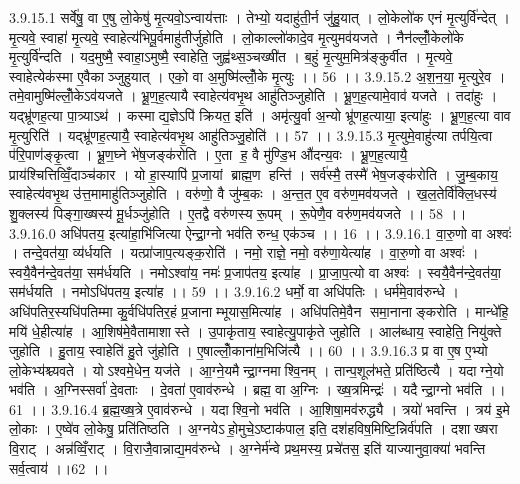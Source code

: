 3.9.15.1
सर्वे॑षु॒ वा ए॒षु लो॒केषु॑ मृ॒त्यवो॒ऽन्वाय॑त्ताः । तेभ्यो॒ यदाहु॑ती॒र्न जु॑हु॒यात् । लो॒केलो॑क एनं मृ॒त्युर्वि॑न्देत् । मृ॒त्यवे॒ स्वाहा॑ मृ॒त्यवे॒ स्वाहेत्य॑भिपू॒र्वमाहु॑तीर्जुहोति । लो॒काल्लो॑कादे॒व मृ॒त्युमव॑यजते । नैन॑ल्लोँ॒केलो॑के मृ॒त्युर्वि॑न्दति । यद॒मुष्मै॒ स्वाहा॒ऽमुष्मै॒ स्वाहेति॒ जुह्व॑थ्स॒ञ्चख्षी॑त । ब॒हुं मृ॒त्युम॒मित्र॑ङ्कुर्वीत । मृ॒त्यवे॒ स्वाहेत्येक॑स्मा ए॒वैकाञ्जुहुयात् । एको॒ वा अ॒मुष्मि॑ल्लोँ॒के मृ॒त्युः ।। 56 ।।
3.9.15.2
अ॒श॒न॒या॒ मृ॒त्युरे॒व । तमे॒वामुष्मि॑ल्लोँ॒केऽव॑यजते । भ्रू॒ण॒ह॒त्यायै स्वाहेत्य॑वभृ॒थ आहु॑तिञ्जुहोति । भ्रू॒ण॒ह॒त्यामे॒वाव॑ यजते । तदा॑हुः । यद्भ्रू॑णह॒त्या पा॒त्र्याऽथ॑ । कस्माद्य॒ज्ञेऽपि॑ क्रियत॒ इति॑ । अमृ॑त्यु॒र्वा अ॒न्यो भ्रू॑णह॒त्याया॒ इत्या॑हुः । भ्रू॒ण॒ह॒त्या वाव मृ॒त्युरिति॑ । यद्भ्रू॑णह॒त्यायै॒ स्वाहेत्य॑वभृ॒थ आहु॑तिञ्जु॒होति॑ ।। 57 ।।
3.9.15.3
मृ॒त्युमे॒वाहु॑त्या तर्पयि॒त्वा प॑रि॒पाण॑ङ्कृ॒त्वा । भ्रू॒ण॒घ्ने भे॑ष॒जङ्क॑रोति । ए॒ता ह॒ वै मु॑ण्डि॒भ औ॑दन्य॒वः । भ्रू॒ण॒ह॒त्यायै॒ प्राय॑श्चित्तिव्विँ॒दाञ्च॑कार । यो हा॒स्यापि॑ प्र॒जायां ब्राह्म॒ण हन्ति॑ । सर्व॑स्मै॒ तस्मै॑ भेष॒जङ्क॑रोति । जु॒म्ब॒काय॒ स्वाहेत्य॑वभृ॒थ उ॑त्त॒मामाहु॑तिञ्जुहोति । वरु॑णो॒ वै जु॑म्ब॒कः । अ॒न्त॒त ए॒व वरु॑ण॒मव॑यजते । ख॒ल॒तेर्वि॑क्लि॒धस्य॑ शु॒क्लस्य॑ पिङ्गा॒ख्षस्य॑ मू॒र्धञ्जु॑होति । ए॒तद्वै वरु॑णस्य रू॒पम् । रू॒पेणै॒व वरु॑ण॒मव॑यजते ।। 58 ।।
3.9.16.0
अधि॑पतय॒ इत्या॑हा॒भि॑जित्या ऐन्द्रा॒ग्नो भव॑ति रुन्ध॒ एक॑ञ्च ।। 16 ।।
3.9.16.1
वा॒रु॒णो वा अश्वः॑ । तन्दे॒वत॑या॒ व्य॑र्धयति । यत्प्रा॑जाप॒त्यङ्क॒रोति॑ । नमो॒ राज्ञे॒ नमो॒ वरु॑णा॒येत्या॑ह । वा॒रु॒णो वा अश्वः॑ । स्वयै॒वैन॑न्दे॒वत॑या॒ सम॑र्धयति । नमोऽश्वा॑य॒ नमः॑ प्र॒जाप॑तय॒ इत्या॑ह । प्रा॒जा॒प॒त्यो वा अश्वः॑ । स्वयै॒वैन॑न्दे॒वत॑या॒ सम॑र्धयति । नमोऽधि॑पतय॒ इत्या॑ह ।। 59 ।।
3.9.16.2
धर्मो॒ वा अधि॑पतिः । धर्म॑मे॒वाव॑रुन्धे । अधि॑पतिर॒स्यधि॑पतिम्मा कु॒र्वधि॑पतिर॒हं प्र॒जानाम्भूयास॒मित्या॑ह । अधि॑पतिमे॒वैन॑ समा॒नानाङ्करोति । मान्धे॑हि॒ मयि॑ धे॒हीत्या॑ह । आ॒शिष॑मे॒वैतामाशास्ते । उ॒पाकृ॑ताय॒ स्वाहेत्यु॒पाकृ॑ते जुहोति । आल॑ब्धाय॒ स्वाहेति॒ नियु॑क्ते जुहोति । हु॒ताय॒ स्वाहेति॑ हु॒ते जु॑होति । ए॒षाल्लोँ॒काना॑म॒भिजि॑त्यै ।। 60 ।।
3.9.16.3
प्र वा ए॒ष ए॒भ्यो लो॒केभ्य॑श्च्यवते । योऽश्वमे॒धेन॒ यज॑ते । आ॒ग्ने॒यमैन्द्रा॒ग्नमाश्वि॒नम् । तान्प॒शूल॑भते॒ प्रति॑ष्ठित्यै । यदाग्ने॒यो भव॑ति । अ॒ग्निस्सर्वा॑ दे॒वताः । दे॒वता॑ ए॒वाव॑रुन्धे । ब्रह्म॒ वा अ॒ग्निः । ख्ष॒त्रमिन्द्रः॑ । यदैन्द्रा॒ग्नो भव॑ति ।। 61 ।।
3.9.16.4
ब्र॒ह्म॒ख्ष॒त्रे ए॒वाव॑रुन्धे । यदाश्वि॒नो भव॑ति । आ॒शिषा॒मव॑रुद्ध्यै । त्रयो॑ भवन्ति । त्रय॑ इ॒मे लो॒काः । ए॒ष्वे॑व लो॒केषु॒ प्रति॑तिष्ठति । अ॒ग्नयेऽ॑हो॒मुचे॒ऽष्टाक॑पाल॒ इति॒ दश॑हविष॒मिष्टि॒न्निर्व॑पति । दशाख्षरा वि॒राट् । अन्न॑व्विँ॒राट् । वि॒राजै॒वान्नाद्य॒मव॑रुन्धे । अ॒ग्नेर्म॑न्वे प्रथ॒मस्य॒ प्रचे॑तस॒ इति॑ याज्यानुवा॒क्या॑ भवन्ति सर्व॒त्वाय॑ ।।62 ।।
